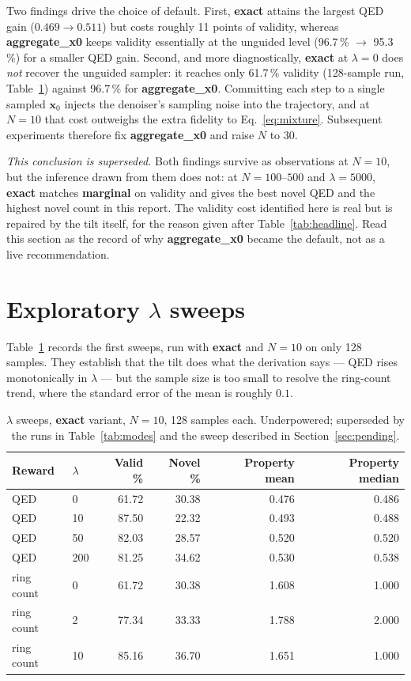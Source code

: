 \documentclass[11pt]{article}
\begin{document}
Two findings drive the choice of default. First, \textbf{exact} attains the
largest QED gain ($0.469 \to 0.511$) but costs roughly 11 points of validity,
whereas \textbf{aggregate\_x0} keeps validity essentially at the unguided level
(96.7\,\% $\to$ 95.3\,\%) for a smaller QED gain. Second, and more
diagnostically, \textbf{exact} at $\lambda = 0$ does \emph{not} recover the
unguided sampler: it reaches only 61.7\,\% validity (128-sample run,
Table~\ref{tab:lambda}) against 96.7\,\% for \textbf{aggregate\_x0}. Committing
each step to a single sampled $\mathbf{x}_0$ injects the denoiser's sampling
noise into the trajectory, and at $N = 10$ that cost outweighs the extra
fidelity to Eq.~\eqref{eq:mixture}. Subsequent experiments therefore fix
\textbf{aggregate\_x0} and raise $N$ to 30.

\emph{This conclusion is superseded.} Both findings survive as observations at
$N = 10$, but the inference drawn from them does not: at $N = 100$--$500$ and
$\lambda = 5000$, \textbf{exact} matches \textbf{marginal} on validity and gives
the best novel QED and the highest novel count in this report. The validity cost
identified here is real but is repaired by the tilt itself, for the reason given
after Table~\ref{tab:headline}. Read this section as the record of why
\textbf{aggregate\_x0} became the default, not as a live recommendation.

\section{Exploratory $\lambda$ sweeps}

Table~\ref{tab:lambda} records the first sweeps, run with \textbf{exact} and
$N = 10$ on only 128 samples. They establish that the tilt does what the
derivation says --- QED rises monotonically in $\lambda$ --- but the sample
size is too small to resolve the ring-count trend, where the standard error of
the mean is roughly $0.1$.

\begin{table}[h]
\centering
\caption{$\lambda$ sweeps, \textbf{exact} variant, $N=10$, 128 samples each.
Underpowered; superseded by the runs in Table~\ref{tab:modes} and the sweep
described in Section~\ref{sec:pending}.}
\label{tab:lambda}
\begin{tabular}{llrrrr}
\toprule
Reward & $\lambda$ & Valid \% & Novel \% & Property mean & Property median \\
\midrule
QED        & 0   & 61.72 & 30.38 & 0.476 & 0.486 \\
QED        & 10  & 87.50 & 22.32 & 0.493 & 0.488 \\
QED        & 50  & 82.03 & 28.57 & 0.520 & 0.520 \\
QED        & 200 & 81.25 & 34.62 & 0.530 & 0.538 \\
\midrule
ring count & 0   & 61.72 & 30.38 & 1.608 & 1.000 \\
ring count & 2   & 77.34 & 33.33 & 1.788 & 2.000 \\
ring count & 10  & 85.16 & 36.70 & 1.651 & 1.000 \\
\bottomrule
\end{tabular}
\end{table}
\end{document}
